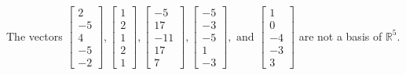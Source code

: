 \begin{exercise}
\begin{exerciseStatement}
  \end{exerciseStatement}
  \begin{exerciseAnswer}
   The vectors \(\left[\begin{array}{r}
2 \\
-5 \\
4 \\
-5 \\
-2
\end{array}\right] , \left[\begin{array}{r}
1 \\
2 \\
1 \\
2 \\
1
\end{array}\right] , \left[\begin{array}{r}
-5 \\
17 \\
-11 \\
17 \\
7
\end{array}\right] , \left[\begin{array}{r}
-5 \\
-3 \\
-5 \\
1 \\
-3
\end{array}\right] , \text{ and } \left[\begin{array}{r}
1 \\
0 \\
-4 \\
-3 \\
3
\end{array}\right]\) 
  	 are not  a basis of \(\mathbb{R}^5\).
  


  \end{exerciseAnswer}
\end{exercise}